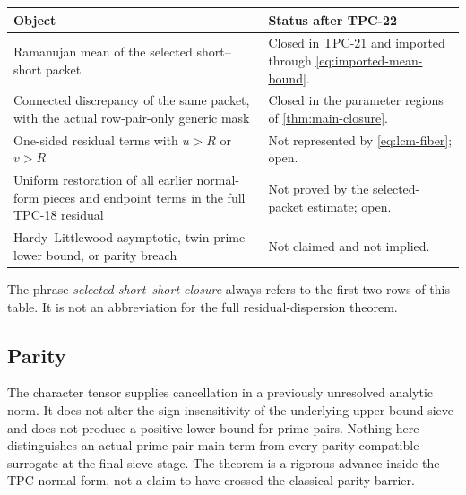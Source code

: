 \begin{center}
\begin{tabular}{>{\raggedright\arraybackslash}p{}
                >{\raggedright\arraybackslash}p{}}
\toprule
Object & Status after TPC-22\\
\midrule
Ramanujan mean of the selected short--short packet
& Closed in TPC-21 and imported through
  \eqref{eq:imported-mean-bound}.\\
\addlinespace
Connected discrepancy of the same packet, with the actual
row-pair-only generic mask
& Closed in the parameter regions of
  \cref{thm:main-closure}.\\
\addlinespace
One-sided residual terms with \(u>R\) or \(v>R\)
& Not represented by \eqref{eq:lcm-fiber}; open.\\
\addlinespace
Uniform restoration of all earlier normal-form pieces and endpoint
terms in the full TPC-18 residual
& Not proved by the selected-packet estimate; open.\\
\addlinespace
Hardy--Littlewood asymptotic, twin-prime lower bound, or parity breach
& Not claimed and not implied.\\
\bottomrule
\end{tabular}
\end{center}

The phrase \emph{selected short--short closure} always refers to the
first two rows of this table.  It is not an abbreviation for the full
residual-dispersion theorem.

\subsection{Parity}

The character tensor supplies cancellation in a previously unresolved
analytic norm.  It does not alter the sign-insensitivity of the
underlying upper-bound sieve and does not produce a positive lower bound
for prime pairs.  Nothing here distinguishes an actual prime-pair main
term from every parity-compatible surrogate at the final sieve stage.
The theorem is a rigorous advance inside the TPC normal form, not a
claim to have crossed the classical parity barrier.
